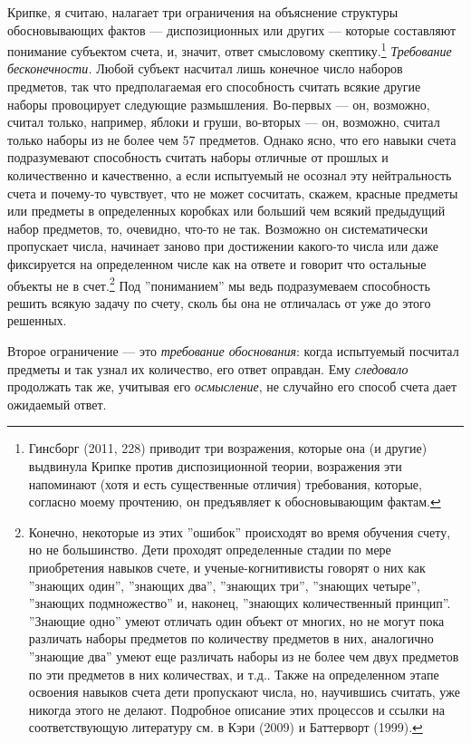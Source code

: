 \documentclass[11pt]{book}
\begin{document}
Крипке, я считаю, налагает три ограничения на объяснение структуры обосновывающих фактов --- диспозиционных или других --- которые составляют понимание субъектом счета, и, значит, ответ смысловому скептику.\footnote{Гинсборг (2011, 228) приводит три возражения, которые она (и другие) выдвинула Крипке против диспозиционной теории, возражения эти напоминают (хотя и есть существенные отличия) требования, которые, согласно моему прочтению, он предъявляет к обосновывающим фактам.} \textit{Требование бесконечности.} Любой субъект насчитал лишь конечное число наборов предметов, так что предполагаемая его способность считать всякие другие наборы провоцирует следующие размышления. Во-первых --- он, возможно, считал только, например, яблоки и груши, во-вторых --- он, возможно, считал только наборы из не более чем 57 предметов. Однако ясно, что его навыки счета подразумевают способность считать наборы отличные от прошлых и количественно и качественно, а если испытуемый не осознал эту нейтральность счета и почему-то чувствует, что не может сосчитать, скажем, красные предметы или предметы в определенных коробках или больший чем всякий предыдущий набор предметов, то, очевидно, что-то не так. Возможно он систематически пропускает числа, начинает заново при достижении какого-то числа или даже фиксируется на определенном числе как на ответе и говорит что остальные объекты не в счет.\footnote{Конечно, некоторые из этих ''ошибок'' происходят во время обучения счету, но не большинство. Дети проходят определенные стадии по мере приобретения навыков счете, и ученые-когнитивисты говорят о них как ''знающих один'', ''знающих два'', ''знающих три'', ''знающих четыре'', ''знающих подмножество'' и, наконец, ''знающих количественный принцип''. ''Знающие одно'' умеют отличать один объект от многих, но не могут пока различать наборы предметов по количеству предметов в них, аналогично ''знающие два'' умеют еще различать наборы из не более чем двух предметов по эти предметов в них количествах, и т.д.. Также на определенном этапе освоения навыков счета дети пропускают числа, но, научившись считать, уже никогда этого не делают. Подробное описание этих процессов и ссылки на соответствующую литературу см. в Кэри (2009) и Баттерворт (1999).} Под ''пониманием'' мы ведь подразумеваем способность решить всякую задачу по счету, сколь бы она не отличалась от уже до этого решенных.

Второе ограничение --- это \textit{требование обоснования}: когда испытуемый посчитал предметы и так узнал их количество, его ответ оправдан. Ему \textit{следовало} продолжать так же, учитывая его \textit{осмысление}, не случайно его способ счета дает ожидаемый ответ.
\end{document}
